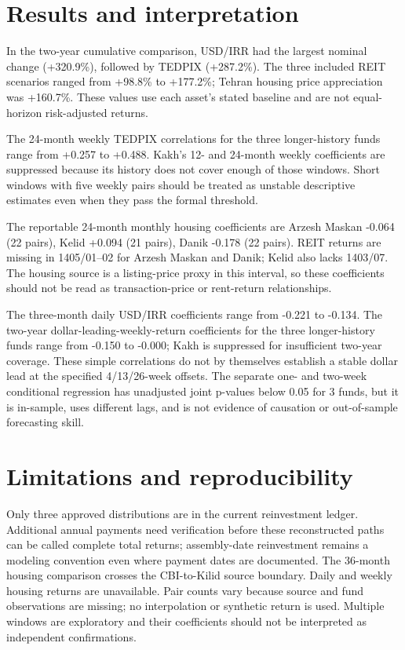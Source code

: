 \documentclass[11pt,a4paper]{article}
\begin{document}
\section{Results and interpretation}

In the two-year cumulative comparison, USD/IRR had the largest nominal change (+320.9\%), followed by TEDPIX (+287.2\%). The three included REIT scenarios ranged from +98.8\% to +177.2\%; Tehran housing price appreciation was +160.7\%. These values use each asset's stated baseline and are not equal-horizon risk-adjusted returns.

The 24-month weekly TEDPIX correlations for the three longer-history funds range from +0.257 to +0.488. Kakh's 12- and 24-month weekly coefficients are suppressed because its history does not cover enough of those windows. Short windows with five weekly pairs should be treated as unstable descriptive estimates even when they pass the formal threshold.

The reportable 24-month monthly housing coefficients are Arzesh Maskan -0.064 (22 pairs), Kelid +0.094 (21 pairs), Danik -0.178 (22 pairs). REIT returns are missing in 1405/01--02 for Arzesh Maskan and Danik; Kelid also lacks 1403/07. The housing source is a listing-price proxy in this interval, so these coefficients should not be read as transaction-price or rent-return relationships.

The three-month daily USD/IRR coefficients range from -0.221 to -0.134. The two-year dollar-leading-weekly-return coefficients for the three longer-history funds range from -0.150 to -0.000; Kakh is suppressed for insufficient two-year coverage. These simple correlations do not by themselves establish a stable dollar lead at the specified 4/13/26-week offsets. The separate one- and two-week conditional regression has unadjusted joint p-values below 0.05 for 3 funds, but it is in-sample, uses different lags, and is not evidence of causation or out-of-sample forecasting skill.

\section{Limitations and reproducibility}

Only three approved distributions are in the current reinvestment ledger. Additional annual payments need verification before these reconstructed paths can be called complete total returns; assembly-date reinvestment remains a modeling convention even where payment dates are documented. The 36-month housing comparison crosses the CBI-to-Kilid source boundary. Daily and weekly housing returns are unavailable. Pair counts vary because source and fund observations are missing; no interpolation or synthetic return is used. Multiple windows are exploratory and their coefficients should not be interpreted as independent confirmations.
\end{document}
